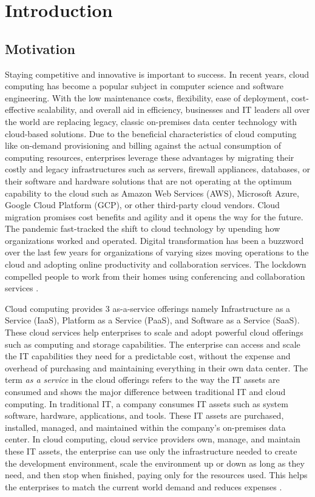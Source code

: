 
\chapter{Introduction}


\section{Motivation}
\par Staying competitive and innovative is important to success. In recent years, cloud computing has become a
popular subject in computer science and software engineering. With the low maintenance costs, flexibility, ease of deployment, cost-effective scalability, and overall aid in efficiency, businesses and IT leaders all over the world are replacing legacy, classic on-premises data center technology with cloud-based solutions. Due to the beneficial characteristics of cloud computing like on-demand provisioning and billing against the actual consumption of computing resources, enterprises leverage these advantages by migrating their costly and legacy infrastructures such as servers, firewall appliances, databases, or their software and hardware solutions that are not operating at the optimum capability to the cloud such as Amazon Web Services (AWS), Microsoft Azure, Google Cloud Platform (GCP), or other third-party cloud vendors. Cloud migration promises cost benefits and agility and it opens the way for the future. The pandemic fast-tracked the shift to cloud technology by upending how organizations worked and operated. Digital transformation has been a buzzword over the last few years for organizations of varying sizes moving operations to the cloud and adopting online productivity and collaboration services. The lockdown compelled people to work from their homes using conferencing and collaboration services \cite{2}.


\par Cloud computing provides 3 as-a-service offerings namely Infrastructure as a Service (IaaS), Platform as a
Service (PaaS), and Software as a Service (SaaS). These cloud services help enterprises to scale and adopt powerful cloud offerings such as computing and storage capabilities. The enterprise can access and scale the IT capabilities they need for a predictable cost, without the expense and overhead of purchasing and maintaining everything in their own data center. The term \textit{as a service} in the cloud offerings refers to the way the IT assets are consumed and shows the major difference between traditional IT and cloud computing. In traditional IT, a company consumes IT assets such as system software, hardware, applications, and tools. These IT assets are purchased, installed, managed, and maintained within the company’s on-premises data center. In cloud computing, cloud service providers own, manage, and maintain these IT assets, the enterprise can use only the infrastructure needed to create the development environment, scale the environment up or down as long as they need, and then stop when finished, paying only for the resources used. This helps the enterprises to match the current world demand and reduces expenses \cite{3}.

